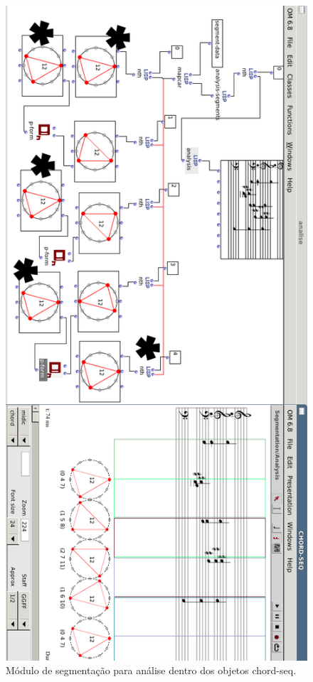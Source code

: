 \documentclass[
	12pt,				%
	openright,			%
	twoside,			%
	a4paper,			%
	english,			%
	french,				%
	spanish,			%
	brazil				%
	]{abntex2}
\begin{document}
\begin{figure}[!h]
	\caption{\label{fig_grafico}Módulo de segmentação para análise dentro dos objetos chord-seq. }
	\begin{center}
	    \includegraphics[scale=0.4]{OM_settheory/OMsetAnalise.png}
	\end{center}
\end{figure}	
		
\end{document}
